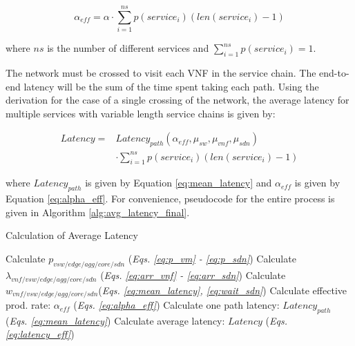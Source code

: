 \begin{equation}
\label{eq:alpha_eff}
\alpha_{eff} = \alpha \cdot \sum_{i=1}^{ns} p(service_i) (len(service_i) - 1)
\end{equation}

\noindent where $ns$ is the number of different services and $\sum_{i=1}^{ns} p(service_i) = 1$.

The network must be crossed to visit each VNF in the service chain. The end-to-end latency will be the sum of the time spent taking each path. Using the derivation for the case of a single crossing of the network, the average latency for multiple services with variable length service chains is given by:

\begin{equation}
\label{eq:latency_eff}
\begin{split}
Latency = & Latency_{path}(\alpha_{eff}, \mu_{sw}, \mu_{vnf}, \mu_{sdn}) \\
			  &\cdot \sum_{i=1}^{ns} p(service_i) (len(service_i) - 1)
\end{split}
\end{equation}

\noindent where $Latency_{path}$ is given by Equation \ref{eq:mean_latency} and $\alpha_{eff}$ is given by Equation \ref{eq:alpha_eff}. For convenience, pseudocode for the entire process is given in Algorithm \ref{alg:avg_latency_final}.

\begin{algorithm}

\caption{Calculation of Average Latency}
\label{alg:avg_latency_final}

\begin{algorithmic}[1]
\STATE Calculate $p_{vsw/edge/agg/core/sdn}$ \hfill(\textit{Eqs. \ref{eq:p_vm} - \ref{eq:p_sdn}})
\STATE Calculate $\lambda_{vnf/vsw/edge/agg/core/sdn}$ \hfill(\textit{Eqs. \ref{eq:arr_vnf} - \ref{eq:arr_sdn}})
\STATE Calculate $w_{vnf/vsw/edge/agg/core/sdn}$\hfill(\textit{Eqs. \ref{eq:mean_latency}, \ref{eq:wait_sdn}})
\STATE Calculate effective prod. rate: $\alpha_{eff}$ \hfill(\textit{Eqs. \ref{eq:alpha_eff}})
\STATE Calculate one path latency: $Latency_{path}$ \hfill (\textit{Eqs. \ref{eq:mean_latency}})
\STATE Calculate average latency: $Latency$ \hfill (\textit{Eqs. \ref{eq:latency_eff}})
\end{algorithmic}
\end{algorithm}